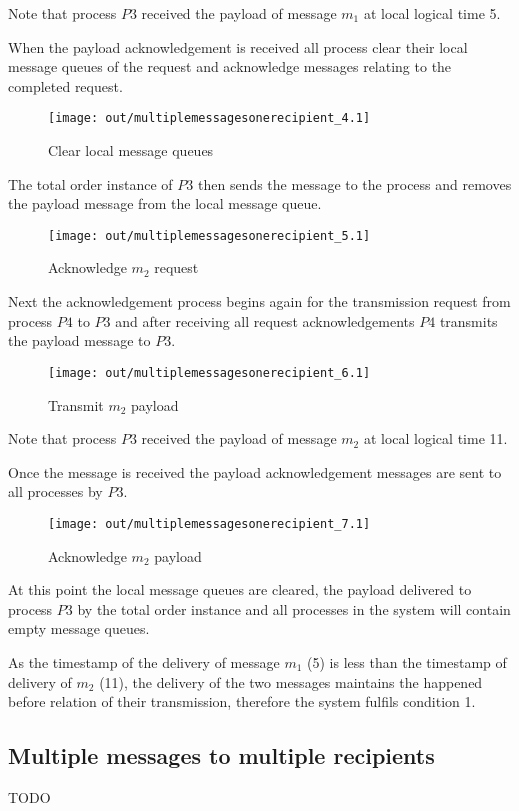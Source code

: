 \documentclass[twocolumn]{article}
\begin{document}
Note that process $P3$ received the payload of message $m_{1}$ at local logical
time 5.

When the payload acknowledgement is received all process clear their local
message queues of the request and acknowledge messages relating to the completed
request.

\begin{figure}[h!]
  \centering
  \texttt{[image: out/multiplemessagesonerecipient\_4.1]}
  \caption{Clear local message queues}
  \label{fig:multiplemessagesonerecipient_4}
\end{figure}
\FloatBarrier

The total order instance of $P3$ then sends the message to the process and
removes the payload message from the local message queue.

\begin{figure}[h!]
  \centering
  \texttt{[image: out/multiplemessagesonerecipient\_5.1]}
  \caption{Acknowledge $m_{2}$ request}
  \label{fig:multiplemessagesonerecipient_5}
\end{figure}
\FloatBarrier

Next the acknowledgement process begins again for the transmission request
from process $P4$ to $P3$ and after receiving all request acknowledgements $P4$
transmits the payload message to $P3$.

\begin{figure}[h!]
  \centering
  \texttt{[image: out/multiplemessagesonerecipient\_6.1]}
  \caption{Transmit $m_{2}$ payload}
  \label{fig:multiplemessagesonerecipient_6}
\end{figure}
\FloatBarrier

Note that process $P3$ received the payload of message $m_{2}$ at local logical
time 11.

Once the message is received the payload acknowledgement messages are sent to
all processes by $P3$.

\begin{figure}[h!]
  \centering
  \texttt{[image: out/multiplemessagesonerecipient\_7.1]}
  \caption{Acknowledge $m_{2}$ payload}
  \label{fig:multiplemessagesonerecipient_7}
\end{figure}
\FloatBarrier

At this point the local message queues are cleared, the payload delivered to
process $P3$ by the total order instance and all processes in the system will
contain empty message queues.

As the timestamp of the delivery of message $m_{1}$ (5) is less than the
timestamp of delivery of $m_{2}$ (11), the delivery of the two messages
maintains the happened before relation of their transmission, therefore the
system fulfils condition 1.

\subsection{Multiple messages to multiple recipients}

TODO
\end{document}
